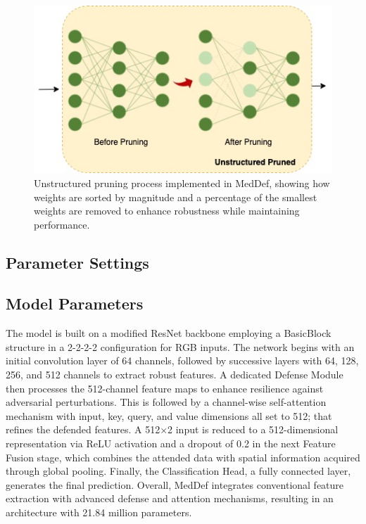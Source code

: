 \documentclass[preprint,12pt]{elsarticle}
\begin{document}
\begin{figure}[!t]
\centerline{\includegraphics[width=\columnwidth]{fig/fig4.jpg}}
\caption{Unstructured pruning process implemented in MedDef, showing how weights are sorted by magnitude and a percentage of the smallest weights are removed to enhance robustness while maintaining performance.}
\label{fig:pruning}
\end{figure}

\subsection{Parameter Settings}
\label{sec:parameters}

\subsection{Model Parameters}
The model is built on a modified ResNet backbone employing a BasicBlock structure in a 2-2-2-2 configuration for RGB inputs. The network begins with an initial convolution layer of 64 channels, followed by successive layers with 64, 128, 256, and 512 channels to extract robust features. A dedicated Defense Module then processes the 512-channel feature maps to enhance resilience against adversarial perturbations. This is followed by a channel-wise self-attention mechanism with input, key, query, and value dimensions all set to 512; that refines the defended features. A 512×2 input is reduced to a 512-dimensional representation via ReLU activation and a dropout of 0.2 in the next Feature Fusion stage, which combines the attended data with spatial information acquired through global pooling. Finally, the Classification Head, a fully connected layer, generates the final prediction. Overall, MedDef integrates conventional feature extraction with advanced defense and attention mechanisms, resulting in an architecture with 21.84 million parameters.
\end{document}
